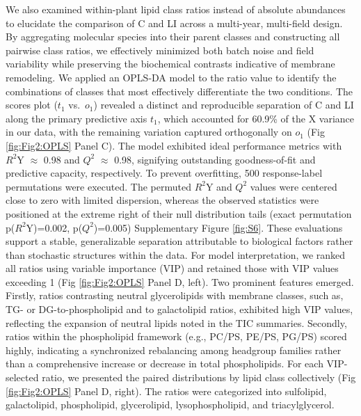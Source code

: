 \documentclass[10pt,letterpaper]{article}
\begin{document}
\begin{itemize}
We also examined within-plant lipid class ratios instead of absolute abundances to elucidate the comparison of C and LI across a multi-year, multi-field design. By aggregating molecular species into their parent classes and constructing all pairwise class ratios, we effectively minimized both batch noise and field variability while preserving the biochemical contrasts indicative of membrane remodeling. We applied an OPLS-DA model to the ratio value to identify the combinations of classes that most effectively differentiate the two conditions. The scores plot ($t_1$ vs.\ $o_1$) revealed a distinct and reproducible separation of C and LI along the primary predictive axis $t_1$, which accounted for 60.9\% of the X variance in our data, with the remaining variation captured orthogonally on $o_1$ (Fig \ref{fig:Fig2:OPLS} Panel C). The model exhibited ideal performance metrics with $R^2$Y $\approx$ 0.98 and $Q^2$ $\approx$ 0.98, signifying outstanding goodness-of-fit and predictive capacity, respectively. To prevent overfitting, 500 response-label permutations were executed. The permuted $R^2$Y and $Q^2$ values were centered close to zero with limited dispersion, whereas the observed statistics were positioned at the extreme right of their null distribution tails (exact permutation p($R^2$Y)=0.002, p($Q^2$)=0.005) Supplementary Figure \ref{fig:S6}. These evaluations support a stable, generalizable separation attributable to biological factors rather than stochastic structures within the data. For model interpretation, we ranked all ratios using variable importance (VIP) and retained those with VIP values exceeding 1 (Fig \ref{fig:Fig2:OPLS} Panel D, left). Two prominent features emerged. Firstly, ratios contrasting neutral glycerolipids with membrane classes, such as, TG- or DG-to-phospholipid and to galactolipid ratios, exhibited high VIP values, reflecting the expansion of neutral lipids noted in the TIC summaries. Secondly, ratios within the phospholipid framework (e.g., PC/PS, PE/PS, PG/PS) scored highly, indicating a synchronized rebalancing among headgroup families rather than a comprehensive increase or decrease in total phospholipids. For each VIP-selected ratio, we presented the paired distributions by lipid class collectively (Fig \ref{fig:Fig2:OPLS} Panel D, right). The ratios were categorized into sulfolipid, galactolipid, phospholipid, glycerolipid, lysophospholipid, and triacylglycerol. 


\end{itemize}
\end{document}
